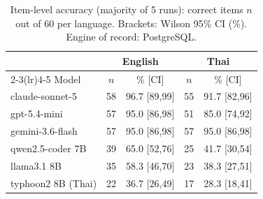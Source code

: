 \begin{table}[t]
\caption{Item-level accuracy (majority of 5 runs): correct items $n$
out of 60 per language. Brackets: Wilson 95\% CI (\%). Engine of
record: PostgreSQL.}
\label{tab:headline}
\centering\footnotesize\setlength{\tabcolsep}{3.5pt}
\begin{tabular}{lcccc}
\toprule
 & \multicolumn{2}{c}{English} & \multicolumn{2}{c}{Thai} \\
\cmidrule(lr){2-3}\cmidrule(lr){4-5}
Model & $n$ & \% [CI] & $n$ & \% [CI] \\
\midrule
claude-sonnet-5 & 58 & 96.7 [89,99] & 55 & 91.7 [82,96] \\
gpt-5.4-mini & 57 & 95.0 [86,98] & 51 & 85.0 [74,92] \\
gemini-3.6-flash & 57 & 95.0 [86,98] & 57 & 95.0 [86,98] \\
qwen2.5-coder 7B & 39 & 65.0 [52,76] & 25 & 41.7 [30,54] \\
llama3.1 8B & 35 & 58.3 [46,70] & 23 & 38.3 [27,51] \\
typhoon2 8B (Thai) & 22 & 36.7 [26,49] & 17 & 28.3 [18,41] \\
\bottomrule
\end{tabular}
\end{table}
